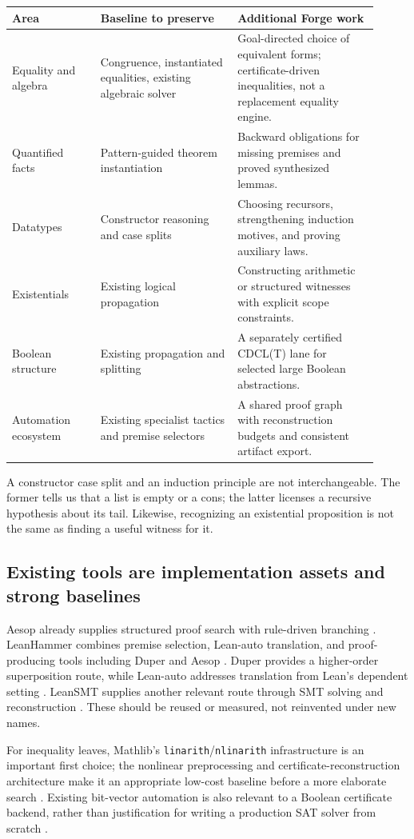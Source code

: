 \documentclass[11pt,letterpaper]{article}
\newcommand{\code}[1]{\texttt{#1}}
\newcommand{\Forge}{\textsf{Forge}}
\theoremstyle{definition}\newtheorem{definition}[theorem]{Definition}
\theoremstyle{remark}\newtheorem{remark}[theorem]{Remark}
\begin{document}
\begin{longtable}{P{0.22\linewidth}P{0.34\linewidth}P{0.35\linewidth}}
\toprule
Area & Baseline to preserve & Additional \Forge{} work \\
\midrule\endhead
Equality and algebra & Congruence, instantiated equalities, existing algebraic solver & Goal-directed choice of equivalent forms; certificate-driven inequalities, not a replacement equality engine. \\
Quantified facts & Pattern-guided theorem instantiation & Backward obligations for missing premises and proved synthesized lemmas. \\
Datatypes & Constructor reasoning and case splits & Choosing recursors, strengthening induction motives, and proving auxiliary laws. \\
Existentials & Existing logical propagation & Constructing arithmetic or structured witnesses with explicit scope constraints. \\
Boolean structure & Existing propagation and splitting & A separately certified CDCL(T) lane for selected large Boolean abstractions. \\
Automation ecosystem & Existing specialist tactics and premise selectors & A shared proof graph with reconstruction budgets and consistent artifact export. \\
\bottomrule
\end{longtable}
A constructor case split and an induction principle are not interchangeable. The former tells us that a list is empty or a cons; the latter licenses a recursive hypothesis about its tail. Likewise, recognizing an existential proposition is not the same as finding a useful witness for it.

\subsection{Existing tools are implementation assets and strong baselines}
Aesop already supplies structured proof search with rule-driven branching \cite{aesop}. LeanHammer combines premise selection, Lean-auto translation, and proof-producing tools including Duper and Aesop \cite{hammer}. Duper provides a higher-order superposition route, while Lean-auto addresses translation from Lean's dependent setting \cite{duper,auto}. LeanSMT supplies another relevant route through SMT solving and reconstruction \cite{leansmt}. These should be reused or measured, not reinvented under new names.

For inequality leaves, Mathlib's \code{linarith}/\code{nlinarith} infrastructure is an important first choice; the nonlinear preprocessing and certificate-reconstruction architecture make it an appropriate low-cost baseline before a more elaborate search \cite{nlinarith,linarithverify}. Existing bit-vector automation is also relevant to a Boolean certificate backend, rather than justification for writing a production SAT solver from scratch \cite{bv}.
\end{document}
